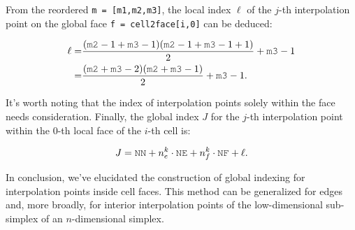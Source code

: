 \documentclass[12pt, a4paper]{article}
\newcommand{\mc}{\mcode}
\begin{document}
From the reordered \lstinline{m = [m1,m2,m3]}, the local index \(\ell\) of the $j$-th interpolation point on the global face \lstinline{f = cell2face[i,0]} can be deduced:

\begin{align*}
   \ell = & \frac{(\mc{m2}-1 + \mc{m3}-1)(\mc{m2}-1 + \mc{m3}-1 + 1)}{2} + \mc{m3}-1 \\
   =& \frac{(\mc{m2} + \mc{m3} -2)(\mc{m2} + \mc{m3} - 1)}{2} + \mc{m3}-1.
\end{align*}

It's worth noting that the index of interpolation points solely within the face needs consideration. Finally, the global index \(J\) for the $j$-th interpolation point within the $0$-th local face of the $i$-th cell is:

\[
J = \mc{NN} + n_e^k\cdot \mc{NE} + n_f^k\cdot \mc{NF} + \ell.
\]

In conclusion, we've elucidated the construction of global indexing for interpolation points inside cell faces. This method can be generalized for edges and, more broadly, for interior interpolation points of the low-dimensional sub-simplex of an \(n\)-dimensional simplex.
\end{document}
